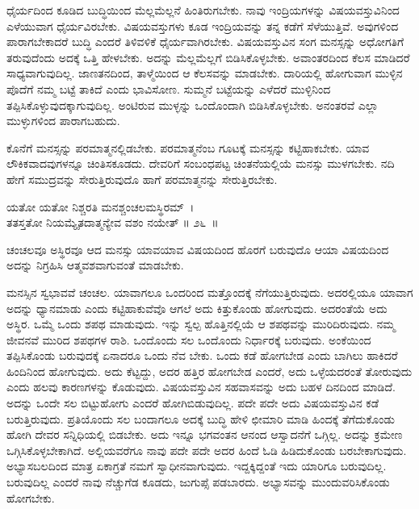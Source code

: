ಧೈರ್ಯದಿಂದ ಕೂಡಿದ ಬುದ್ಧಿಯಿಂದ ಮೆಲ್ಲಮೆಲ್ಲನೆ ಹಿಂತಿರುಗಬೇಕು. ನಾವು ಇಂದ್ರಿಯಗಳನ್ನು ವಿಷಯವಸ್ತುವಿನಿಂದ ಎಳೆಯುವಾಗ ಧೈರ್ಯವಿರಬೇಕು. ವಿಷಯವಸ್ತುಗಳು ಕೂಡ ಇಂದ್ರಿಯವನ್ನು ತನ್ನ ಕಡೆಗೆ ಸೆಳೆಯುತ್ತಿವೆ. ಅವುಗಳಿಂದ ಪಾರಾಗಬೇಕಾದರೆ ಬುದ್ಧಿ ಎಂದರೆ ತಿಳಿವಳಿಕೆ ಧೈರ್ಯವಾಗಿರಬೇಕು. ವಿಷಯವಸ್ತುವಿನ ಸಂಗ ಮನಸ್ಸನ್ನು ಅಧೋಗತಿಗೆ ತರುವುದೆಂದು ಅದಕ್ಕೆ ಒತ್ತಿ ಹೇಳಬೇಕು. ಅದನ್ನು ಮೆಲ್ಲಮೆಲ್ಲಗೆ ಬಿಡಿಸಿಕೊಳ್ಳಬೇಕು. ಅವಾಂತರದಿಂದ ಕೆಲಸ ಮಾಡಿದರೆ ಸಾಧ್ಯವಾಗುವುದಿಲ್ಲ. ಜಾಣತನದಿಂದ, ತಾಳ್ಮೆಯಿಂದ ಆ ಕೆಲಸವನ್ನು ಮಾಡಬೇಕು. ದಾರಿಯಲ್ಲಿ ಹೋಗುವಾಗ ಮುಳ್ಳಿನ ಪೊದೆಗೆ ನಮ್ಮ ಬಟ್ಟೆ ತಾಕಿದೆ ಎಂದು ಭಾವಿಸೋಣ. ಸುಮ್ಮನೆ ಬಟ್ಟೆಯನ್ನು ಎಳೆದರೆ ಮುಳ್ಳಿನಿಂದ ತಪ್ಪಿಸಿಕೊಳ್ಳುವುದಕ್ಕಾಗುವುದಿಲ್ಲ. ಅಂಟಿರುವ ಮುಳ್ಳನ್ನು ಒಂದೊಂದಾಗಿ ಬಿಡಿಸಿಕೊಳ್ಳಬೇಕು. ಅನಂತರವೆ ಎಲ್ಲಾ ಮುಳ್ಳುಗಳಿಂದ ಪಾರಾಗಬಹುದು.

ಕೊನೆಗೆ ಮನಸ್ಸನ್ನು ಪರಮಾತ್ಮನಲ್ಲಿಡಬೇಕು. ಪರಮಾತ್ಮನೆಂಬ ಗೂಟಕ್ಕೆ ಮನಸ್ಸನ್ನು ಕಟ್ಟಿಹಾಕಬೇಕು. ಯಾವ ಲೌಕಿಕವಾದವುಗಳನ್ನೂ ಚಿಂತಿಸಕೂಡದು. ದೇವರಿಗೆ ಸಂಬಂಧಪಟ್ಟ ಚಿಂತನೆ\-ಯಲ್ಲಿಯೆ ಮನಸ್ಸು ಮುಳಗಬೇಕು. ನದಿ ಹೇಗೆ ಸಮುದ್ರವನ್ನು ಸೇರುತ್ತಿರುವುದೊ ಹಾಗೆ ಪರಮಾತ್ಮನನ್ನು ಸೇರುತ್ತಿರಬೇಕು.

\begin{shloka}
ಯತೋ ಯತೋ ನಿಶ್ಚರತಿ ಮನಶ್ಚಂಚಲಮಸ್ಥಿರಮ್~।\\ತತಸ್ತತೋ ನಿಯಮ್ಯೈತದಾತ್ಮನ್ಯೇವ ವಶಂ ನಯೇತ್ \hfill॥ ೨೬~॥
\end{shloka}

\begin{artha}
ಚಂಚಲವೂ ಅಸ್ಥಿರವೂ ಆದ ಮನಸ್ಸು ಯಾವಯಾವ ವಿಷಯದಿಂದ ಹೊರಗೆ ಬರುವುದೊ ಆಯಾ ವಿಷಯದಿಂದ ಅದನ್ನು ನಿಗ್ರಹಿಸಿ ಆತ್ಮವಶವಾಗುವಂತೆ ಮಾಡಬೇಕು.
\end{artha}

ಮನಸ್ಸಿನ ಸ್ವಭಾವವೆ ಚಂಚಲ. ಯಾವಾಗಲೂ ಒಂದರಿಂದ ಮತ್ತೊಂದಕ್ಕೆ ನೆಗೆಯುತ್ತಿರುವುದು. ಅದರಲ್ಲಿಯೂ ಯಾವಾಗ ಅದನ್ನು ಧ್ಯಾನಮಾಡು ಎಂದು ಕಟ್ಟಿಹಾಕುವೆವೊ ಆಗಲೆ ಅದು ಕಿತ್ತುಕೊಂಡು ಹೋಗುವುದು. ಅದರಂತೆಯೆ ಅದು ಅಸ್ಥಿರ. ಒಮ್ಮೆ ಒಂದು ಶಪಥ ಮಾಡುವುದು. ಇನ್ನು ಸ್ವಲ್ಪ ಹೊತ್ತಿನಲ್ಲಿಯೆ ಆ ಶಪಥವನ್ನು ಮುರಿದಿರುವುದು. ನಮ್ಮ ಜೀವನವೆ ಮುರಿದ ಶಪಥಗಳ ರಾಶಿ. ಒಂದೊಂದು ಸಲ ಒಂದೊಂದು ನಿರ್ಧಾರಕ್ಕೆ ಬರುವುದು. ಅಂಕೆಯಿಂದ ತಪ್ಪಿಸಿಕೊಂಡು ಬರುವುದಕ್ಕೆ ಏನಾದರೂ ಒಂದು ನೆವ ಬೇಕು. ಒಂದು ಕಡೆ ಹೋಗಬೇಡ ಎಂದು ಬಾಗಿಲು ಹಾಕಿದರೆ ಹಿಂದಿನಿಂದ ಹೋಗುವುದು. ಅದು ಕೆಟ್ಟದ್ದು, ಅದರ ಹತ್ತಿರ ಹೋಗಬೇಡ ಎಂದರೆ, ಅದು ಒಳ್ಳೆಯದರಂತೆ ತೋರುವುದು ಎಂದು ಹಲವು ಕಾರಣಗಳನ್ನು ಕೊಡುವುದು. ವಿಷಯವಸ್ತುವಿನ ಸಹವಾಸವನ್ನು ಅದು ಬಹಳ ದಿನದಿಂದ ಮಾಡಿದೆ. ಅದನ್ನು ಒಂದೇ ಸಲ ಬಿಟ್ಟುಹೋಗು ಎಂದರೆ ಹೋಗಿಬಿಡುವುದಿಲ್ಲ. ಪದೇ ಪದೇ ಅದು ವಿಷಯವಸ್ತುವಿನ ಕಡೆ ಬರುತ್ತಿರುವುದು. ಪ್ರತಿಯೊಂದು ಸಲ ಬಂದಾಗಲೂ ಅದಕ್ಕೆ ಬುದ್ಧಿ ಹೇಳಿ ಛೀಮಾರಿ ಮಾಡಿ ಹಿಂದಕ್ಕೆ ತೆಗೆದುಕೊಂಡು ಹೋಗಿ ದೇವರ ಸನ್ನಿಧಿಯಲ್ಲಿ ಬಿಡಬೇಕು. ಅದು ಇನ್ನೂ ಭಗವಂತನ ಆನಂದ ಆಸ್ವಾದನೆಗೆ ಒಗ್ಗಿಲ್ಲ. ಅದನ್ನು ಕ್ರಮೇಣ ಒಗ್ಗಿಸಿಕೊಳ್ಳಬೇಕಾಗಿದೆ. ಅಲ್ಲಿಯವರೆಗೂ ನಾವು ಪದೇ ಪದೇ ಅದರ ಹಿಂದೆ ಓಡಿ ಹಿಡಿದುಕೊಂಡು ಬರಬೇಕಾಗುವುದು. ಅಭ್ಯಾಸಬಲದಿಂದ ಮಾತ್ರ ಏಕಾಗ್ರತೆ ನಮಗೆ ಸ್ವಾಧೀನವಾಗುವುದು. ಇದ್ದಕ್ಕಿದ್ದಂತೆ ಇದು ಯಾರಿಗೂ ಬರುವುದಿಲ್ಲ. ಬರುವುದಿಲ್ಲ ಎಂದರೆ ನಾವು ನೆಚ್ಚುಗೆಡ ಕೂಡದು, ಜುಗುಪ್ಸೆ ಪಡಬಾರದು. ಅಭ್ಯಾಸವನ್ನು ಮುಂದುವರಿಸಿಕೊಂಡು ಹೋಗಬೇಕು.

